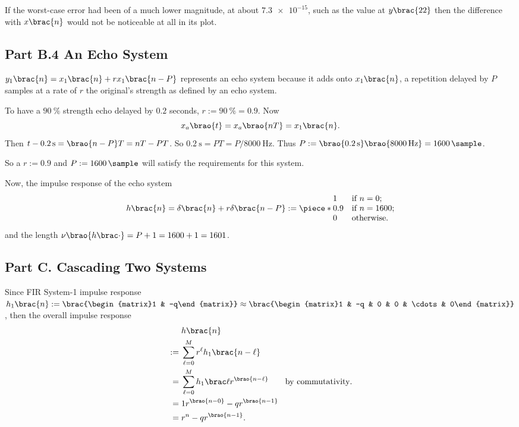 \documentclass[conference]{../lib/IEEEtran}
\DeclarePairedDelimiter\brao()%
\DeclarePairedDelimiter\brac[]%
\DeclarePairedDelimiter\piece\{.%
\newcommand*\hfrac[2]{#1/#2}
\begin{document}
If the worst-case error had been of a much lower magnitude, at about \(\num{7.3e-15}\), such as the value at \(y\brac{22}\) then the difference with \(x\brac{n}\) would not be noticeable at all in its plot.

\subsection{Part B.4 An Echo System}

\(y_1\brac{n} = x_1\brac{n} + rx_1\brac{n - P}\) represents an echo system because it adds onto \(x_1\brac{n}\), a repetition delayed by \(P\) samples at a rate of \(r\) the original's strength as defined by an echo system.

To have a \(\SI{90}\percent\) strength echo delayed by \(0.2\) seconds, \(r := \SI{90}\percent = 0.9\). Now 
\[
	x_a\brao{t} = x_a\brao{nT} = x_1\brac{n}.
\]
Then \(t - \SI{0.2}\second = \brao{n - P}T = nT - PT\). So \(\SI{0.2}\second = PT = \hfrac{P}{\SI{8000}\hertz}\). Thus \(P := \brao{\SI{0.2}\second}\brao{\SI{8000}\hertz} = \SI{1600}\sample\).

So a \(r := 0.9\) and \(P := \SI{1600}\sample\) will satisfy the requirements for this system.

Now, the impulse response of the echo system
\[
	h\brac{n} = \delta\brac{n} + r\delta\brac{n - P} := \piece*{
		\begin{array}{@{}*2l@{}}
			1 & \text{if \(n = 0\)};\\*
			0.9 & \text{if \(n = 1600\)};\\*
			0 & \text{otherwise}.\\*
		\end{array}
	}
\]
and the length \(\nu\brao{h\brac\cdot} = P + 1 = 1600 + 1 = 1601\).

\subsection{Part C. Cascading Two Systems}

Since FIR System-1 impulse response \(h_1\brac{n} := \brac{\begin{matrix}1 & -q\end{matrix}} \approx \brac{\begin{matrix}1 & -q & 0 & 0 & \cdots & 0\end{matrix}}\), then the overall impulse response
\[
    \begin{aligned}
            &h\brac{n}
    \\*
        :={}& \sum_{\ell=0}^{M} r^\ell h_1\brac{n - \ell}
    \\*
        \hphantom:={}& \sum_{\ell=0}^{M} h_1\brac\ell r^{\brao{n - \ell}} \qquad \text{by commutativity}.
    \\*
        \hphantom:={}& 1 r^{\brao{n - 0}} - qr^{\brao{n - 1}}
    \\*
        \hphantom:={}& r^n - qr^{\brao{n - 1}}.
    \\*
    \end{aligned}
\]
\end{document}
